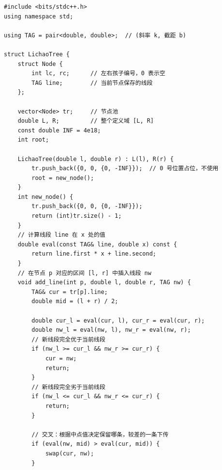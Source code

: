 \begin{lstlisting}
#include <bits/stdc++.h>
using namespace std;

using TAG = pair<double, double>;  // (斜率 k, 截距 b)

struct LichaoTree {
    struct Node {
        int lc, rc;      // 左右孩子编号，0 表示空
        TAG line;        // 当前节点保存的线段
    };

    vector<Node> tr;     // 节点池
    double L, R;         // 整个定义域 [L, R]
    const double INF = 4e18;
    int root;

    LichaoTree(double l, double r) : L(l), R(r) {
        tr.push_back({0, 0, {0, -INF}});  // 0 号位置占位，不使用
        root = new_node();
    }
    int new_node() {
        tr.push_back({0, 0, {0, -INF}});
        return (int)tr.size() - 1;
    }
    // 计算线段 line 在 x 处的值
    double eval(const TAG& line, double x) const {
        return line.first * x + line.second;
    }
    // 在节点 p 对应的区间 [l, r] 中插入线段 nw
    void add_line(int p, double l, double r, TAG nw) {
        TAG& cur = tr[p].line;
        double mid = (l + r) / 2;

        double cur_l = eval(cur, l), cur_r = eval(cur, r);
        double nw_l = eval(nw, l), nw_r = eval(nw, r);
        // 新线段完全优于当前线段
        if (nw_l >= cur_l && nw_r >= cur_r) {
            cur = nw;
            return;
        }
        // 新线段完全劣于当前线段
        if (nw_l <= cur_l && nw_r <= cur_r) {
            return;
        }

        // 交叉：根据中点值决定保留哪条，较差的一条下传
        if (eval(nw, mid) > eval(cur, mid)) {
            swap(cur, nw);
        }


\end{lstlisting}

